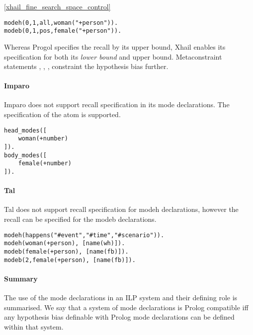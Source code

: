 \begin{exmp}\ref{xhail_fine_search_space_control}
\begin{lstlisting}
modeh(0,1,all,woman("+person")).
modeb(0,1,pos,female("+person")).
\end{lstlisting}
\end{exmp}

Whereas Progol specifies the recall by its upper bound, Xhail enables its specification for both its \emph{lower bound} and upper bound. Metaconstraint statements
, , ,  constraint the hypothesis bias further.

\paragraph{Imparo}\cite{kimber2013imparo}
Imparo does not support recall specification in its mode declarations. The specification of the atom is supported.
\begin{exmp}
\begin{lstlisting}
head_modes([
    woman(+number)
]).
body_modes([
    female(+number)
]).
\end{lstlisting}
\end{exmp}

\paragraph{Tal}
Tal does not support recall specification for modeh declarations, however the recall can be specified for the modeb declarations\cite{corapi2011tal}.
\begin{exmp}
\begin{lstlisting}
modeh(happens("#event","#time","#scenario")).
modeh(woman(+person), [name(wh)]).
modeb(female(+person), [name(fb)]).
modeb(2,female(+person), [name(fb)]).
\end{lstlisting}
\end{exmp}

\paragraph{Summary}
The use of the mode declarations in an ILP system and their defining role is summarised. We say that a system of mode declarations is Prolog compatible iff any hypothesis bias definable with Prolog mode declarations can be defined within that system.

